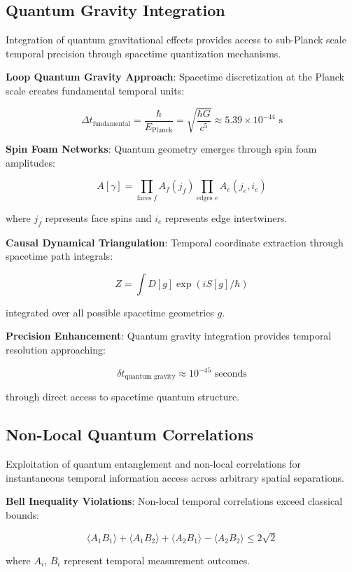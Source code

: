 \documentclass[11pt]{article}
\theoremstyle{remark}
\begin{document}
\subsection{Quantum Gravity Integration}

Integration of quantum gravitational effects provides access to sub-Planck scale temporal precision through spacetime quantization mechanisms.

\textbf{Loop Quantum Gravity Approach}: Spacetime discretization at the Planck scale creates fundamental temporal units:

$$\Delta t_{\text{fundamental}} = \frac{\hbar}{E_{\text{Planck}}} = \sqrt{\frac{\hbar G}{c^5}} \approx 5.39 \times 10^{-44} \text{ s}$$

\textbf{Spin Foam Networks}: Quantum geometry emerges through spin foam amplitudes:

$$A[\gamma] = \prod_{\text{faces } f} A_f(j_f) \prod_{\text{edges } e} A_e(j_e,i_e)$$

where $j_f$ represents face spins and $i_e$ represents edge intertwiners.

\textbf{Causal Dynamical Triangulation}: Temporal coordinate extraction through spacetime path integrals:

$$Z = \int D[g] \exp(iS[g]/\hbar)$$

integrated over all possible spacetime geometries $g$.

\textbf{Precision Enhancement}: Quantum gravity integration provides temporal resolution approaching:

$$\delta t_{\text{quantum gravity}} \approx 10^{-45} \text{ seconds}$$

through direct access to spacetime quantum structure.

\subsection{Non-Local Quantum Correlations}

Exploitation of quantum entanglement and non-local correlations for instantaneous temporal information access across arbitrary spatial separations.

\textbf{Bell Inequality Violations}: Non-local temporal correlations exceed classical bounds:

$$\langle A_1 B_1 \rangle + \langle A_1 B_2 \rangle + \langle A_2 B_1 \rangle - \langle A_2 B_2 \rangle \leq 2\sqrt{2}$$

where $A_i$, $B_i$ represent temporal measurement outcomes.
\end{document}

